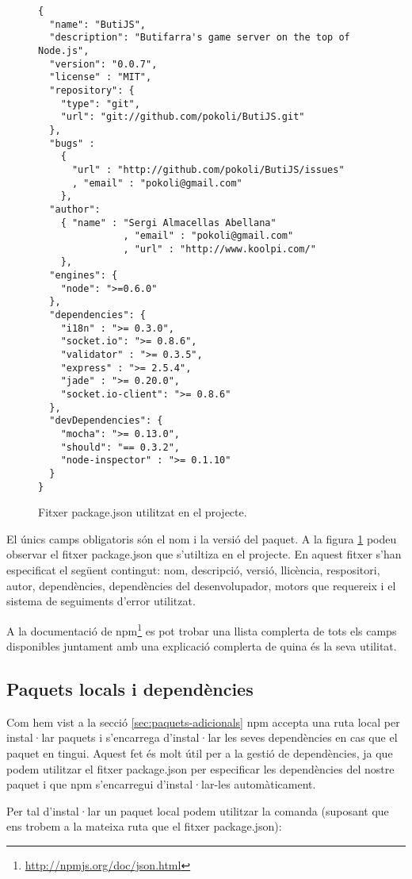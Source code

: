\begin{figure}[htbp]
\begin{lstlisting}
{
  "name": "ButiJS",
  "description": "Butifarra's game server on the top of Node.js",
  "version": "0.0.7",
  "license" : "MIT",
  "repository": {
    "type": "git",
    "url": "git://github.com/pokoli/ButiJS.git"
  },
  "bugs" :
    { 
      "url" : "http://github.com/pokoli/ButiJS/issues"
      , "email" : "pokoli@gmail.com"
    },
  "author":
    { "name" : "Sergi Almacellas Abellana"
               , "email" : "pokoli@gmail.com"
               , "url" : "http://www.koolpi.com/"
    },
  "engines": {
    "node": ">=0.6.0"
  },
  "dependencies": {
    "i18n" : ">= 0.3.0",
    "socket.io": ">= 0.8.6",
    "validator" : ">= 0.3.5",
    "express" : ">= 2.5.4",
    "jade" : ">= 0.20.0",
    "socket.io-client": ">= 0.8.6"
  },
  "devDependencies": {
    "mocha": ">= 0.13.0",
    "should": "== 0.3.2",
    "node-inspector" : ">= 0.1.10"
  }
}
\end{lstlisting}
\caption{Fitxer package.json utilitzat en el projecte.}
\label{fig:package.json}
\end{figure} 

El únics camps obligatoris són el nom i la versió del paquet. A la figura \ref{fig:package.json} podeu observar el fitxer package.json que s'utiltiza en el projecte. En aquest fitxer s'han especificat el següent contingut: nom, descripció, versió, llicència, respositori, autor, dependències, dependències del desenvolupador, motors que requereix i el sistema de seguiments d'error utilitzat. 

A la documentació de npm\footnote{\url{http://npmjs.org/doc/json.html}} es pot trobar una llista complerta de tots els camps disponibles juntament amb una explicació complerta de quina és la seva utilitat. 

\subsection{Paquets locals i dependències}

Com hem vist a la secció \ref{sec:paquets-adicionals} npm accepta una ruta local per instal·lar paquets i s'encarrega d'instal·lar les seves dependències en cas que el paquet en tingui. Aquest fet és molt útil per a la gestió de dependències, ja que podem utilitzar el fitxer package.json per especificar les dependències del nostre paquet i que npm s'encarregui d'instal·lar-les automàticament. 

Per tal d'instal·lar un paquet local podem utilitzar la comanda (suposant que ens trobem a la mateixa ruta que el fitxer package.json): 

